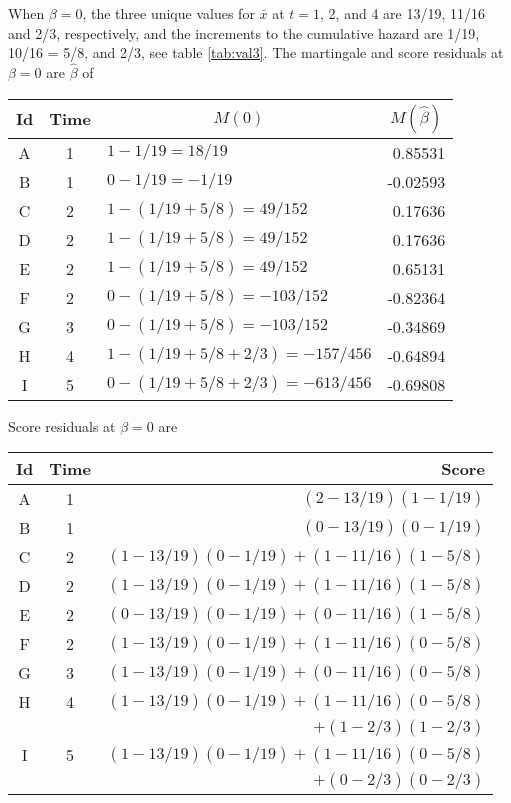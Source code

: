 \documentclass[11pt]{article}
\def\bhat{\hat \beta}        %
\def\xbar{\bar x}
\begin{document}
When $\beta=0$, the three unique values for $\xbar$
at $t=1$, 2, and 4
are 13/19, 11/16 and 2/3,
respectively, and the increments to the cumulative hazard are
1/19, 10/16 = 5/8, and 2/3, see table \ref{tab:val3}.
The martingale and score residuals at $\beta=0$ are
$\bhat$ of
\begin{center}
\begin{tabular}{cc|lr}
Id &Time& \multicolumn{1}{c}{$M(0)$} &\multicolumn{1}{c}{$M(\bhat)$} \\ \hline
A&1 & $1-1/19 = 18/19             $&0.85531\\
B&1 & $0-1/19 = -1/19             $&-0.02593\\
C&2 & $1-(1/19 + 5/8)= 49/152     $&0.17636 \\
D&2 & $1-(1/19 + 5/8)= 49/152     $&0.17636\\
E&2 & $1-(1/19 + 5/8)= 49/152     $&0.65131\\
F&2 & $0-(1/19 + 5/8)= -103/152     $&-0.82364\\
G&3 & $0-(1/19 + 5/8)=  -103/152     $&-0.34869\\
H&4 & $1-(1/19 + 5/8 +2/3)= -157/456 $&-0.64894\\
I&5 & $0-(1/19 + 5/8 +2/3)= -613/456 $&-0.69808\\
\end{tabular}
\end{center}
Score residuals at $\beta=0$ are
\begin{center}
\begin{tabular}{cc|r}
Id &Time& Score \\ \hline
A&1 &$(2-13/19)(1-1/19)$\\
B&1 &$(0-13/19)(0-1/19)$\\
C&2 &$ (1-13/19)(0-1/19) + (1-11/16)(1-5/8) $ \\
D&2 &$(1-13/19)(0-1/19) + (1-11/16)(1-5/8)$ \\
E&2 &$(0-13/19)(0-1/19) + (0-11/16)(1-5/8)$ \\
F&2 &$(1-13/19)(0-1/19) + (1-11/16)(0-5/8)$ \\
G&3 &$(1-13/19)(0-1/19) + (0-11/16)(0-5/8)$ \\
H&4 &$(1-13/19)(0-1/19) + (1-11/16)(0-5/8) $ \\
      &&                $  + (1-2/3)(1-2/3)$ \\
I&5 &$(1-13/19)(0-1/19) + (1-11/16)(0-5/8)$  \\
      &	&$+ (0-2/3)(0-2/3) $ \\
\end{tabular}
\end{center}
\end{document}
